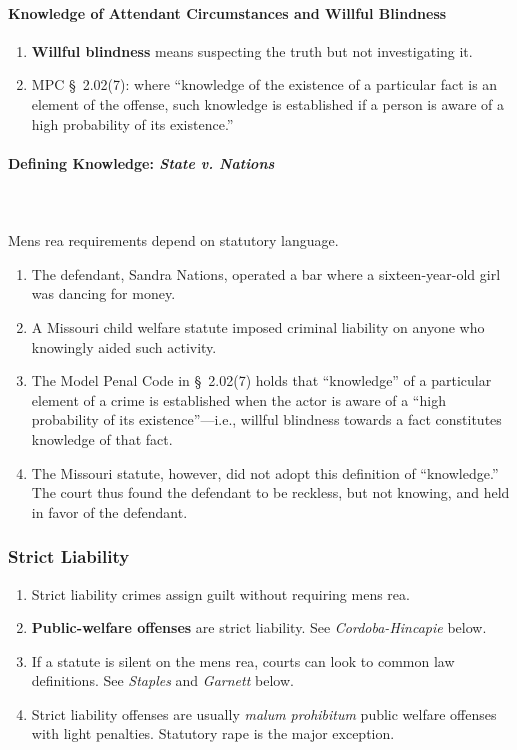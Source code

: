\paragraph{Knowledge of Attendant Circumstances and Willful Blindness}

\begin{enumerate}
    \item \textbf{Willful blindness} means suspecting the truth but not 
    investigating it.
    \item MPC \S\ 2.02(7): where ``knowledge of the existence of a particular 
    fact is an element of the offense, such knowledge is established if a 
    person is aware of a high probability of its existence.''
\end{enumerate}

\paragraph{Defining Knowledge: \emph{State v. Nations}}
~\\\\
Mens rea requirements depend on statutory language.

\begin{enumerate}
    \item The defendant, Sandra Nations, operated a bar where a 
    sixteen-year-old girl was dancing for money.
    \item A Missouri child welfare statute imposed criminal liability on 
    anyone who knowingly aided such activity.
    \item The Model Penal Code in \S\ 2.02(7) holds that ``knowledge'' of a 
    particular element of a crime is established when the actor is aware of a 
    ``high probability of its existence''---i.e., willful blindness towards a 
    fact constitutes knowledge of that fact.
    \item The Missouri statute, however, did not adopt this definition of 
    ``knowledge.'' The court thus found the defendant to be reckless, but not 
    knowing, and held in favor of the defendant.
\end{enumerate}

\subsubsection{Strict Liability}

\begin{enumerate}
    \item Strict liability crimes assign guilt without requiring mens 
    rea.
    \item \textbf{Public-welfare offenses} are strict liability. See 
    \emph{Cordoba-Hincapie} below.
    \item If a statute is silent on the mens rea, courts can look to common 
    law definitions. See \emph{Staples} and \emph{Garnett} below.
    \item Strict liability offenses are usually \emph{malum prohibitum} public 
    welfare offenses with light penalties. Statutory rape is the major 
    exception.
\end{enumerate}

